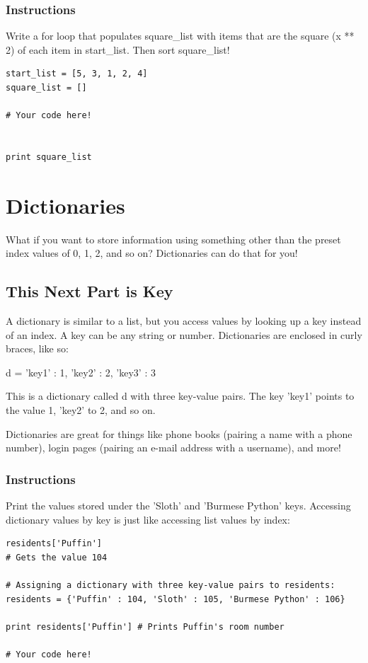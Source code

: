 \documentclass[12pt,a4paper,final,twoside,onecolumn,titlepage]{book}
\begin{document}
\subsubsection{Instructions}

Write a for loop that populates square\_list with items that are the square (x ** 2) of each item in start\_list. Then sort square\_list!
\begin{lstlisting}
start_list = [5, 3, 1, 2, 4]
square_list = []

# Your code here!


print square_list
\end{lstlisting}

\section{Dictionaries}

    What if you want to store information using something other than the preset index values of 0, 1, 2, and so on? Dictionaries can do that for you!

\subsection{This Next Part is Key}

A dictionary is similar to a list, but you access values by looking up a key instead of an index. A key can be any string or number. Dictionaries are enclosed in curly braces, like so:

d = {'key1' : 1, 'key2' : 2, 'key3' : 3}

This is a dictionary called d with three key-value pairs. The key 'key1' points to the value 1, 'key2' to 2, and so on.

Dictionaries are great for things like phone books (pairing a name with a phone number), login pages (pairing an e-mail address with a username), and more!
\subsubsection{Instructions}

Print the values stored under the 'Sloth' and 'Burmese Python' keys. Accessing dictionary values by key is just like accessing list values by index:
\begin{lstlisting}
residents['Puffin']
# Gets the value 104

# Assigning a dictionary with three key-value pairs to residents:
residents = {'Puffin' : 104, 'Sloth' : 105, 'Burmese Python' : 106}

print residents['Puffin'] # Prints Puffin's room number

# Your code here!

\end{lstlisting}
\end{document}
